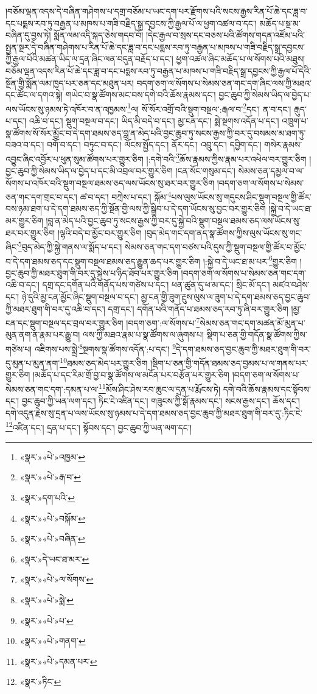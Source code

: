 །བཅོམ་ལྡན་འདས་དེ་བཞིན་གཤེགས་པ་དགྲ་བཅོམ་པ་ཡང་དག་པར་རྫོགས་པའི་སངས་རྒྱས་རིན་པོ་ཆེ་དང་ཟླ་བ་དང་པདྨས་རབ་ཏུ་བརྒྱན་པ་མཁས་པ་གཟི་བརྗིད་སྒྲ་དབྱངས་ཀྱི་རྒྱལ་པོ་ལ་ཕྱག་འཚལ་བ་དང་། མཆོད་པ་སྔ་མ་བཞིན་དུ་བྱས་ཏེ། སྨོན་ལམ་འདི་སྐད་ཅེས་གདབ་བོ། །དེང་རྒྱལ་བ་སྲས་དང་བཅས་པའི་ཚོགས་གདན་འཛོམ་པའི་སྤྱན་སྔར་དེ་བཞིན་གཤེགས་པ་རིན་པོ་ཆེ་དང་ཟླ་བ་དང་པདྨས་རབ་ཏུ་བརྒྱན་པ་མཁས་པ་གཟི་བརྗིད་སྒྲ་དབྱངས་ཀྱི་རྒྱལ་པོའི་མཚན་ཡིད་ལ་དྲན་ཞིང་ལན་བདུན་བརྗོད་པ་དང་། ཕྱག་འཚལ་ཞིང་མཆོད་པ་ལ་སོགས་པའི་མཐུས། བཅོམ་ལྡན་འདས་རིན་པོ་ཆེ་དང་ཟླ་བ་དང་པདྨས་རབ་ཏུ་བརྒྱན་པ་མཁས་པ་གཟི་བརྗིད་སྒྲ་དབྱངས་ཀྱི་རྒྱལ་པོ་དེའི་སྔོན་གྱི་སྨོན་ལམ་ཁྱད་པར་ཅན་དང་མཐུན་པར། བདག་ཅག་ལ་སོགས་པ་སེམས་ཅན་གང་དག་ཞིང་ལས་ཀྱི་མཐའ་དང་ཚོང་ལ་དགའ་སྟེ། གཡེང་བ་སྣ་ཚོགས་མང་བས་དགེ་བའི་ཆོས་རྣམས་དང་། བྱང་ཆུབ་ཀྱི་སེམས་ཡིད་ལ་བྱེད་པ་ལས་ཡོངས་སུ་ཉམས་ཏེ་འཁོར་བ་ན་འཁྱམས་\footnote{«སྣར་»«པེ་»འཁྱམ་}ལ། སོ་སོར་འགྲོ་བའི་སྡུག་བསྔལ་:རྒལ་བ་\footnote{«སྣར་»«པེ་»རྒ་བ་}དང་། ན་བ་དང་། རྒུད་པ་དང་། འཆི་བ་དང་། སྡུག་བསྔལ་བ་དང་། ཡིད་མི་བདེ་བ་དང་། མྱ་ངན་དང་། སྨེ་སྔགས་འདོན་པ་དང་། འཁྲུག་པ་སྣ་ཚོགས་སོ་སོར་མྱོང་བ་དེ་དག་ཐམས་ཅད་བླ་ན་མེད་པའི་བྱང་ཆུབ་ཏུ་སངས་རྒྱས་ཀྱི་བར་དུ་བསམས་མ་ཐག་ཏུ་བཟའ་བ་དང་། བགོ་བ་དང་། བཏུང་བ་དང་། ལོངས་སྤྱོད་དང་། ནོར་དང་། འབྲུ་དང་། དབྱིག་དང་། གསེར་རྣམས་འབྱུང་ཞིང་འབྱོར་པ་ཕུན་སུམ་ཚོགས་པར་གྱུར་ཅིག །:དགེ་བའི་\footnote{«སྣར་»དག་པའི་}ཆོས་རྣམས་ཀྱིས་རྣམ་པར་འཕེལ་བར་གྱུར་ཅིག །བྱང་ཆུབ་ཀྱི་སེམས་ཡིད་ལ་བྱེད་པ་དང་མི་འབྲལ་བར་གྱུར་ཅིག །ངན་སོང་གསུམ་དང་། སེམས་ཅན་དམྱལ་བ་ལ་སོགས་པ་འཁོར་བའི་སྡུག་བསྔལ་ཐམས་ཅད་ལས་ཡོངས་སུ་ཐར་བར་གྱུར་ཅིག །བདག་ཅག་ལ་སོགས་པ་སེམས་ཅན་གང་དག་གྲང་བ་དང་། ཚ་བ་དང་། བཀྲེས་པ་དང་། སྐོམ་\footnote{«སྣར་»«པེ་»བསྐོམ་}པས་ལུས་ཡོངས་སུ་གདུངས་ཤིང་སྡུག་བསྔལ་གྱི་ཚོར་བས་ཉམ་ཐག་པ་དེ་དག་ཐམས་ཅད་ཀྱི་སྔོན་གྱི་ལས་ཀྱི་སྒྲིབ་པ་དེ་དག་ཡོངས་སུ་བྱང་བར་གྱུར་ཅིག །སྐྱེ་བ་དེ་ཡང་ཐ་མར་གྱུར་ཅིག །བླ་ན་མེད་པའི་བྱང་ཆུབ་ཏུ་སངས་རྒྱས་ཀྱི་བར་དུ་སྐྱེ་བའི་སྡུག་བསྔལ་ཐམས་ཅད་ལས་ཡོངས་སུ་ཐར་བར་གྱུར་ཅིག །ལྷའི་བདེ་བ་མྱོང་བར་གྱུར་ཅིག །བུད་མེད་གང་དག་ནད་སྣ་ཚོགས་ཀྱིས་ལུས་ཡོངས་སུ་གང་ཞིང་\footnote{«སྣར་»«པེ་»བཞིན་}བུད་མེད་ཀྱི་སྐྱེ་གནས་ལ་སྨོད་པ་དང་། སེམས་ཅན་གང་དག་བཙས་པའི་དུས་ཀྱི་སྡུག་བསྔལ་གྱི་ཚོར་བ་མྱོང་བ་དེ་དག་ཐམས་ཅད་དང་སྡུག་བསྔལ་ཐམས་ཅད་རྒྱུན་ཆད་པར་གྱུར་ཅིག །:སྐྱེ་བ་དེ་ཡང་ཐ་མ་པར་\footnote{«སྣར་»དེ་ཡང་ཐ་མར་}གྱུར་ཅིག །བྱང་ཆུབ་ཀྱི་མཐར་ཐུག་གི་བར་དུ་སྐྱེས་པ་ཉིད་ཐོབ་པར་གྱུར་ཅིག །བདག་ཅག་ལ་སོགས་པ་སེམས་ཅན་གང་དག་འཆི་བ་དང་། དགྲ་དང་དགོན་པའི་གནོད་པས་གཙེས་པ་དང་། ཕན་ཚུན་དུ་ཕ་མ་དང་། སྲིང་མོ་དང་། མཛའ་བཤེས་དང་། ཉེ་དུའི་མྱ་ངན་མྱོང་ཞིང་སྡུག་བསྔལ་བ་དང་། མྱ་ངན་གྱི་ཟུག་རྔུས་ལུས་ལ་ཟུག་པ་དེ་དག་ཐམས་ཅད་བྱང་ཆུབ་ཀྱི་མཐར་ཐུག་གི་བར་དུ་འཆི་བ་དང་། དགྲ་དང་། དགོན་པའི་གནོད་པ་ཐམས་ཅད་རབ་ཏུ་ཞི་བར་གྱུར་ཅིག །མྱ་ངན་དང་སྡུག་བསྔལ་དང་བྲལ་བར་གྱུར་ཅིག །བདག་ཅག་:ལ་སོགས་པ་\footnote{«སྣར་»«པེ་»ལ་སོགས་}སེམས་ཅན་གང་དག་མཚན་མོ་མུན་པ་མུན་ནག་ན་རྣམ་པར་རྒྱུ་བ། ལས་ཀྱི་མཐའ་རྣམ་པ་སྣ་ཚོགས་ལ་ཞུགས་པ། སྡིག་པ་ཅན་གྱི་གདོན་སྣ་ཚོགས་ཀྱིས་གཙེས་པ། འཇིགས་པས་སྨྲེ་\footnote{«སྣར་»«པེ་»སྨེ་}སྔགས་སྣ་ཚོགས་འདོན་:པ་དང་། \footnote{«སྣར་»«པེ་»པ་}དེ་དག་ཐམས་ཅད་བྱང་ཆུབ་ཀྱི་མཐར་ཐུག་གི་བར་དུ་མུན་པ་མུན་ནག་\footnote{«སྣར་»«པེ་»གནག་}ཐམས་ཅད་མེད་པར་གྱུར་ཅིག །སྡིག་པ་ཅན་གྱི་གདོན་ཐམས་ཅད་བྱམས་པ་ལ་གནས་པར་གྱུར་ཅིག །མཆོད་པ་དང་རིམ་གྲོ་བྱ་བ་སྣ་ཚོགས་ལ་མངོན་པར་བརྩོན་པར་གྱུར་ཅིག །བདག་ཅག་ལ་སོགས་པ་སེམས་ཅན་གང་དག་:དམན་པ་ལ་\footnote{«སྣར་»«པེ་»དམན་པར་}མོས་ཤིང་ཤེས་རབ་ཆུང་ལ་དྲན་པ་རྨོངས་ཏེ། དགེ་བའི་ཆོས་རྣམས་དང་སྟོབས་དང་། བྱང་ཆུབ་ཀྱི་ཡན་ལག་དང་། ཏིང་ངེ་འཛིན་དང་། གཟུངས་ཀྱི་སྒོ་རྣམས་དང་། སངས་རྒྱས་དང་། ཆོས་དང་། དགེ་འདུན་རྗེས་སུ་དྲན་པ་ལས་ཡོངས་སུ་ཉམས་པ་དེ་དག་ཐམས་ཅད་བྱང་ཆུབ་ཀྱི་མཐར་ཐུག་གི་བར་དུ་:ཏིང་ངེ་\footnote{«སྣར་»ཏིང་}འཛིན་དང་། དྲན་པ་དང་། སྟོབས་དང་། བྱང་ཆུབ་ཀྱི་ཡན་ལག་དང་། 